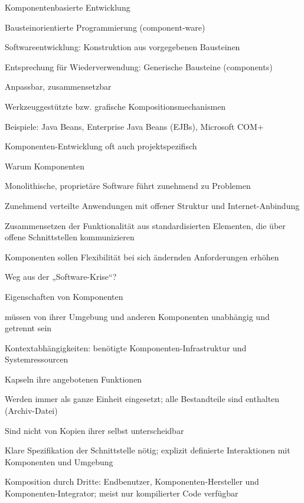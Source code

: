 \documentclass[a4paper]{article}
\begin{document}
\begin{multicols}{3}
  Komponentenbasierte Entwicklung
  \begin{itemize*}
    \item Bausteinorientierte Programmierung (component-ware)
    \item Softwareentwicklung: Konstruktion aus vorgegebenen Bausteinen
    \item Entsprechung für Wiederverwendung: Generische Bausteine (components)
          \begin{itemize*}
            \item Anpassbar, zusammensetzbar
          \end{itemize*}
    \item Werkzeuggestützte bzw. grafische Kompositionsmechanismen
    \item Beispiele: Java Beans, Enterprise Java Beans (EJBs), Microsoft COM+
    \item Komponenten-Entwicklung oft auch projektspezifisch
    \item Warum Komponenten
          \begin{itemize*}
            \item Monolithische, proprietäre Software führt zunehmend zu Problemen
            \item Zunehmend verteilte Anwendungen mit offener Struktur und Internet-Anbindung
            \item Zusammensetzen der Funktionalität aus standardisierten Elementen, die über offene Schnittstellen kommunizieren
            \item Komponenten sollen Flexibilität bei sich ändernden Anforderungen erhöhen
            \item Weg aus der „Software-Krise“?
          \end{itemize*}
    \item Eigenschaften von Komponenten
          \begin{itemize*}
            \item müssen von ihrer Umgebung und anderen Komponenten unabhängig und getrennt sein
            \item Kontextabhängigkeiten: benötigte Komponenten-Infrastruktur und Systemressourcen
            \item Kapseln ihre angebotenen Funktionen
            \item Werden immer als ganze Einheit eingesetzt; alle Bestandteile sind enthalten (Archiv-Datei)
            \item Sind nicht von Kopien ihrer selbst unterscheidbar
            \item Klare Spezifikation der Schnittstelle nötig; explizit definierte Interaktionen mit Komponenten und Umgebung
            \item Komposition durch Dritte: Endbenutzer, Komponenten-Hersteller und Komponenten-Integrator; meist nur kompilierter Code verfügbar
          \end{itemize*}
  \end{itemize*}


\end{multicols}
\end{document}
